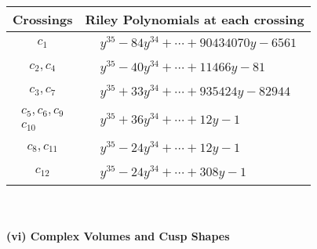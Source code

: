 \documentclass[1p]{elsarticle_modified}
\theoremstyle{definition}
\begin{document}
\begin{tabular}{m{50pt}|m{274pt}}
Crossings & \hspace{64pt}Riley Polynomials at each crossing \\
\hline $$\begin{aligned}c_{1}\end{aligned}$$&$\begin{aligned}
&y^{35}-84 y^{34}+\cdots+90434070 y-6561
\end{aligned}$\\
\hline $$\begin{aligned}c_{2},c_{4}\end{aligned}$$&$\begin{aligned}
&y^{35}-40 y^{34}+\cdots+11466 y-81
\end{aligned}$\\
\hline $$\begin{aligned}c_{3},c_{7}\end{aligned}$$&$\begin{aligned}
&y^{35}+33 y^{34}+\cdots+935424 y-82944
\end{aligned}$\\
\hline $$\begin{aligned}c_{5},c_{6},c_{9}\\c_{10}\end{aligned}$$&$\begin{aligned}
&y^{35}+36 y^{34}+\cdots+12 y-1
\end{aligned}$\\
\hline $$\begin{aligned}c_{8},c_{11}\end{aligned}$$&$\begin{aligned}
&y^{35}-24 y^{34}+\cdots+12 y-1
\end{aligned}$\\
\hline $$\begin{aligned}c_{12}\end{aligned}$$&$\begin{aligned}
&y^{35}-24 y^{34}+\cdots+308 y-1
\end{aligned}$\\
\hline
\end{tabular}\\~\\
\newpage\flushleft \textbf{(vi) Complex Volumes and Cusp Shapes}
\end{document}
